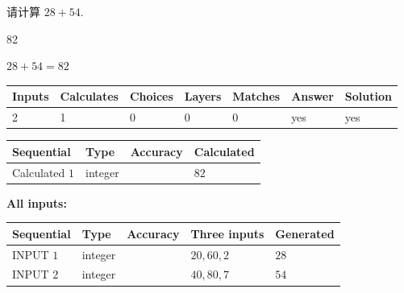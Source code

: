 \documentclass{ctexart}
\begin{document}
  
 
请计算 $ %
28 +  %
54 $.
 
 
 
\noindent{}
 
 

82
 
 
\noindent{}
 
 

 
 
 
\noindent{}
 
 

$ %
28 +  %
54=   %
82$
 
 
\noindent{}
 
 

 
   
   
   
   
\noindent\begin{tabular}{|l|l|l|l|l|l|l|}
 \hline
Inputs & Calculates & Choices & Layers & Matches & Answer & Solution \\ \hline
 2  & 
 1  & 
 0
  & 
 0  & 
 0  & 
  yes & 
  yes 
  \\ \hline
 \end{tabular}
   
   
   
   
\noindent{}
   
   
  
  
\noindent\begin{tabular}{|l|l|l|l|}
\hline
 Sequential & Type & Accuracy & Calculated \\ 
\hline
 
 
  Calculated $  1 $ & integer &  & 
  $ 82 $ 
 \\  \hline  
 \end{tabular}
   
   
   
   
\noindent\vspace{0.1in}\hspace{-0.08in} {\textbf{\Large{All inputs: }}}
   
   
  
  
\noindent\begin{tabular}{|l|l|l|l|l|}
\hline
 Sequential & Type & Accuracy & Three inputs & Generated \\ 
\hline
 
 
  INPUT $  1 $ & integer &  & $
 20
 , 
 60
 , 
 2
 $ & $ 28 $ 
 \\  \hline  
 
 
  INPUT $  2 $ & integer &  & $
 40
 , 
 80
 , 
 7
 $ & $ 54 $ 
 \\  \hline  
 \end{tabular}
   
\end{document}
